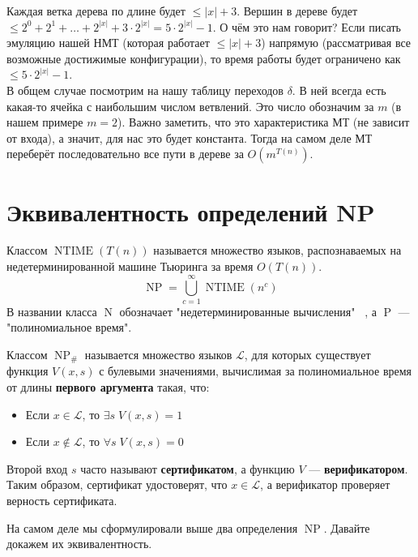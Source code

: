 \documentclass[11pt]{article}
\DeclareMathOperator{\NTIME}{NTIME}
\DeclareMathOperator{\Poly}{P}
\DeclareMathOperator{\NotDet}{N}
\DeclareMathOperator{\NP}{NP}
\begin{document}
Каждая ветка дерева по длине будет $\leq |x| + 3$. Вершин в дереве будет $\leq 2^0 + 2^1 + \ldots + 2^{|x|} + 3 \cdot 2^{|x|} = 5 \cdot 2^{|x|} - 1$. 
О чём это нам говорит? Если писать эмуляцию нашей НМТ (которая работает $\leq |x| + 3$) напрямую (рассматривая все возможные достижимые конфигурации), то время работы будет ограничено как $\leq 5 \cdot 2^{|x|} - 1$. \\
В общем случае посмотрим на нашу таблицу переходов $\delta$. В ней всегда есть какая-то ячейка с наибольшим числом ветвлений. Это число обозначим за $m$ (в нашем примере $m = 2$). Важно заметить, что это характеристика МТ (не зависит от входа), а значит, для нас это будет константа. 
Тогда на самом деле МТ переберёт последовательно все пути в дереве за $O\left(m^{T(n)}\right)$.

\section{Эквивалентность определений NP}

\begin{definition}
    Классом $\NTIME(T(n))$ называется множество языков, распознаваемых на недетерминированной машине Тьюринга за время $O(T(n))$.
    \[\NP = \bigcup_{c = 1}^{\infty} \NTIME(n^c)\]
    В названии класса $\NotDet$ обозначает "недетерминированные вычисления" \ , а $\Poly$ --- "полиномиальное время".
\end{definition}

\begin{definition}
    Классом $\NP_{\#}$ называется множество языков $\mathcal{L}$, для которых существует функция $V(x, s)$ с булевыми значениями, вычислимая за полиномиальное время от длины \textbf{первого аргумента} такая, что:
    \begin{itemize}
        \item Если $x \in \mathcal{L}$, то $\exists s \; V(x, s) = 1$
        \item Если $x \not \in \mathcal{L}$, то $\forall s \; V(x, s) = 0$
    \end{itemize}
    Второй вход $s$ часто называют \textbf{сертификатом}, а функцию $V$ --- \textbf{верификатором}. Таким образом, сертификат удостоверят, что $x \in \mathcal{L}$, а верификатор проверяет верность сертификата.
\end{definition}

\begin{remark}
  На самом деле мы сформулировали выше два определения $\NP$. Давайте докажем их эквивалентность.
\end{remark}
\end{document}

